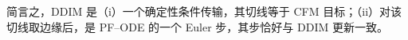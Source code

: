 简言之，DDIM 是（i）一个确定性条件传输，其切线等于 CFM 目标；（ii）对该切线取边缘后，是 PF--ODE 的一个 Euler 步，其步恰好与 DDIM 更新一致。


\newpage






